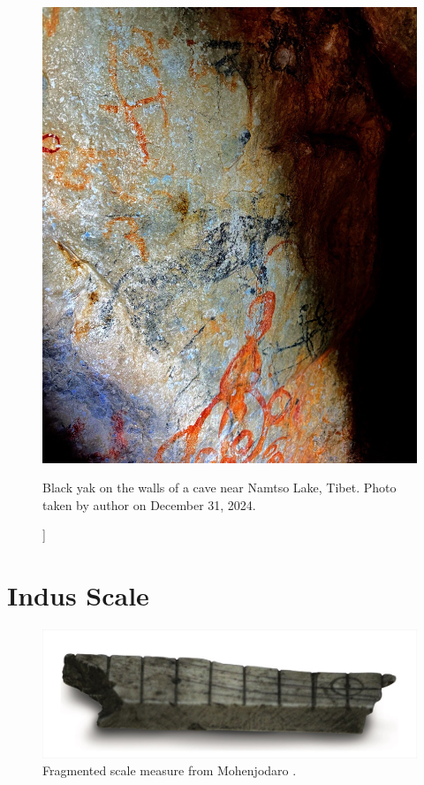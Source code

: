 \documentclass[11pt,a4paper,oneside]{report}
\begin{document}
 \begin{figure}[H]
    \centering
    \includegraphics[width=1\linewidth]{Images/tibetan_rock_yak.jpg}
     \caption[Black Yak Tibetan Cave Pictograph]]{Black yak on the walls of a cave near Namtso Lake, Tibet. Photo taken by author on December 31, 2024.}
\end{figure}

\section{Indus Scale}
\label{app: scale}
 \begin{figure}[H]
    \centering
    \includegraphics[width=1\linewidth]{Images/indus_scale.jpg}
     \caption{Fragmented scale measure from Mohenjodaro \cite{guha_history_2022, mackay_household_1938}.}
\end{figure}
\end{document}
